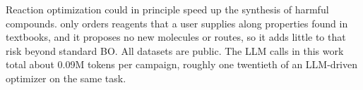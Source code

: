 Reaction optimization could in principle speed up the synthesis of harmful compounds. \ours{} only orders reagents that a user supplies along properties found in textbooks, and it proposes no new molecules or routes, so it adds little to that risk beyond standard BO. All datasets are public. The LLM calls in this work total about 0.09M tokens per campaign, roughly one twentieth of an LLM-driven optimizer on the same task.
